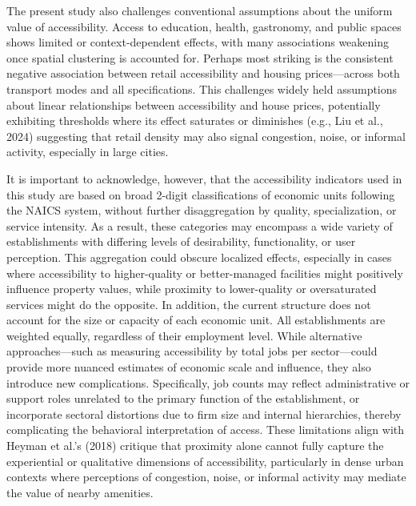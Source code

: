 \documentclass[
  12pt,
]{report}
\begin{document}
The present study also challenges conventional assumptions about the
uniform value of accessibility. Access to education, health, gastronomy,
and public spaces shows limited or context-dependent effects, with many
associations weakening once spatial clustering is accounted for. Perhaps
most striking is the consistent negative association between retail
accessibility and housing prices---across both transport modes and all
specifications. This challenges widely held assumptions about linear
relationships between accessibility and house prices, potentially
exhibiting thresholds where its effect saturates or diminishes (e.g.,
Liu et al., 2024) suggesting that retail density may also signal
congestion, noise, or informal activity, especially in large cities.

It is important to acknowledge, however, that the accessibility
indicators used in this study are based on broad 2-digit classifications
of economic units following the NAICS system, without further
disaggregation by quality, specialization, or service intensity. As a
result, these categories may encompass a wide variety of establishments
with differing levels of desirability, functionality, or user
perception. This aggregation could obscure localized effects, especially
in cases where accessibility to higher-quality or better-managed
facilities might positively influence property values, while proximity
to lower-quality or oversaturated services might do the opposite. In
addition, the current structure does not account for the size or
capacity of each economic unit. All establishments are weighted equally,
regardless of their employment level. While alternative
approaches---such as measuring accessibility by total jobs per
sector---could provide more nuanced estimates of economic scale and
influence, they also introduce new complications. Specifically, job
counts may reflect administrative or support roles unrelated to the
primary function of the establishment, or incorporate sectoral
distortions due to firm size and internal hierarchies, thereby
complicating the behavioral interpretation of access. These limitations
align with Heyman et al.'s (2018) critique that proximity alone cannot
fully capture the experiential or qualitative dimensions of
accessibility, particularly in dense urban contexts where perceptions of
congestion, noise, or informal activity may mediate the value of nearby
amenities.
\end{document}
